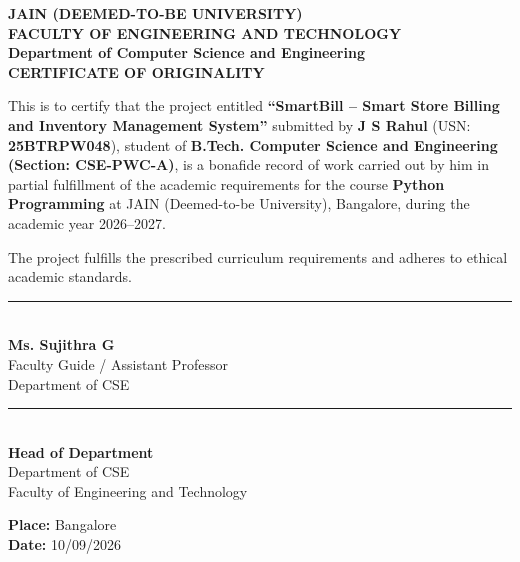 \documentclass[12pt,a4paper]{article}
\begin{document}
\newpage
\thispagestyle{plain}
\begin{center}
    \vspace*{0.5cm}
    {\Large\textbf{JAIN (DEEMED-TO-BE UNIVERSITY)}}\\[0.15cm]
    {\large\textbf{FACULTY OF ENGINEERING AND TECHNOLOGY}}\\[0.15cm]
    {\normalsize\textbf{Department of Computer Science and Engineering}}\\[0.5cm]
    {\large\textbf{\textcolor{primary}{CERTIFICATE OF ORIGINALITY}}}\\[0.8cm]
\end{center}

\noindent This is to certify that the project entitled \textbf{``SmartBill -- Smart Store Billing and Inventory Management System''} submitted by \textbf{J S Rahul} (USN: \textbf{25BTRPW048}), student of \textbf{B.Tech. Computer Science and Engineering (Section: CSE-PWC-A)}, is a bonafide record of work carried out by him in partial fulfillment of the academic requirements for the course \textbf{Python Programming} at JAIN (Deemed-to-be University), Bangalore, during the academic year 2026--2027.

\vspace{0.6cm}
\noindent The project fulfills the prescribed curriculum requirements and adheres to ethical academic standards.

\vspace{3.5cm}

\noindent
\begin{minipage}{0.45\textwidth}
    \rule{6cm}{0.4pt}\\[0.15cm]
    \textbf{Ms. Sujithra G}\\[0.1cm]
    Faculty Guide / Assistant Professor\\[0.1cm]
    Department of CSE
\end{minipage}
\hfill
\begin{minipage}{0.45\textwidth}
    \flushright
    \rule{6cm}{0.4pt}\\[0.15cm]
    \textbf{Head of Department}\\[0.1cm]
    Department of CSE\\[0.1cm]
    Faculty of Engineering and Technology
\end{minipage}

\vspace{1.5cm}
\noindent \textbf{Place:} Bangalore\\
\textbf{Date:} 10/09/2026
\end{document}
